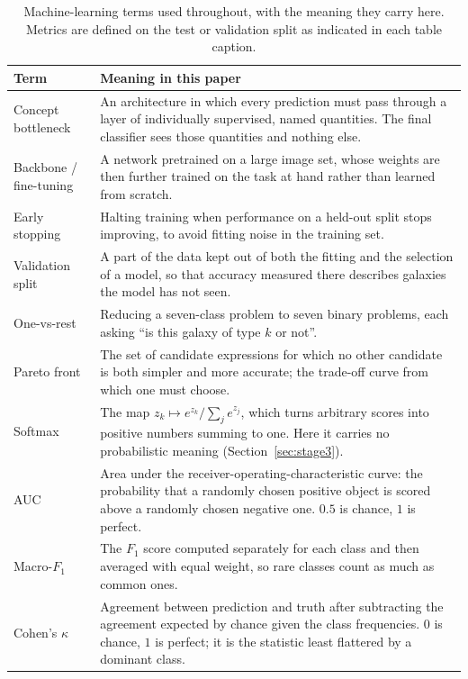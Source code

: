 \documentclass[11pt]{article}
\begin{document}
\begin{table}[htbp]
\centering
\caption{Machine-learning terms used throughout, with the meaning they carry
here. Metrics are defined on the test or validation split as indicated in each
table caption.}
\label{tab:glossary}
\small
\setlength{\tabcolsep}{5pt}
\begin{tabular}{p{}p{}}
\toprule
Term & Meaning in this paper \\
\midrule
Concept bottleneck & An architecture in which every prediction must pass
through a layer of individually supervised, named quantities. The final
classifier sees those quantities and nothing else. \\
Backbone / fine-tuning & A network pretrained on a large image set, whose
weights are then further trained on the task at hand rather than learned from
scratch. \\
Early stopping & Halting training when performance on a held-out split stops
improving, to avoid fitting noise in the training set. \\
Validation split & A part of the data kept out of both the fitting and the
selection of a model, so that accuracy measured there describes galaxies the
model has not seen. \\
One-vs-rest & Reducing a seven-class problem to seven binary problems, each
asking ``is this galaxy of type $k$ or not''. \\
Pareto front & The set of candidate expressions for which no other candidate
is both simpler and more accurate; the trade-off curve from which one must
choose. \\
Softmax & The map $z_k \mapsto e^{z_k}/\sum_j e^{z_j}$, which turns arbitrary
scores into positive numbers summing to one. Here it carries no probabilistic
meaning (Section~\ref{sec:stage3}). \\
AUC & Area under the receiver-operating-characteristic curve: the probability
that a randomly chosen positive object is scored above a randomly chosen
negative one. $0.5$ is chance, $1$ is perfect. \\
Macro-$F_1$ & The $F_1$ score computed separately for each class and then
averaged with equal weight, so rare classes count as much as common ones. \\
Cohen's $\kappa$ & Agreement between prediction and truth after subtracting
the agreement expected by chance given the class frequencies. $0$ is chance,
$1$ is perfect; it is the statistic least flattered by a dominant class. \\

\end{tabular}
\end{table}
\end{document}
